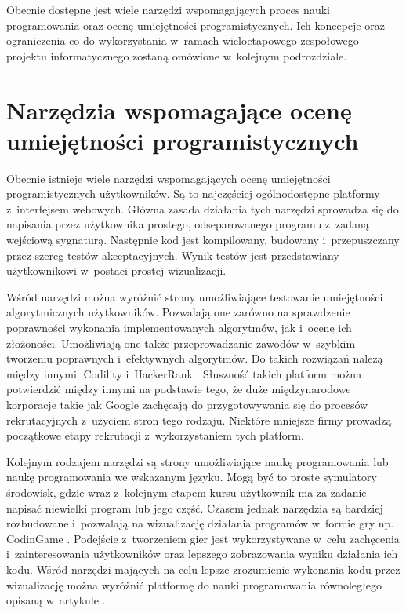 Obecnie dostępne jest wiele narzędzi wspomagających proces nauki programowania oraz ocenę umiejętności programistycznych.
Ich koncepcje oraz ograniczenia co do wykorzystania w~ramach wieloetapowego zespołowego projektu informatycznego zostaną omówione w~kolejnym podrozdziale.


\section{Narzędzia wspomagające ocenę umiejętności programistycznych}
\label{tools}

Obecnie istnieje wiele narzędzi wspomagających ocenę umiejętności programistycznych użytkowników.
Są to najczęściej ogólnodostępne platformy z~interfejsem webowych.
Główna zasada działania tych narzędzi sprowadza się do napisania przez użytkownika prostego, odseparowanego programu z~zadaną wejściową sygnaturą.
Następnie kod jest kompilowany, budowany i~przepuszczany przez szereg testów akceptacyjnych.
Wynik testów jest przedstawiany użytkownikowi w~postaci prostej wizualizacji.

Wśród narzędzi można wyróżnić strony umożliwiające testowanie umiejętności algorytmicznych użytkowników.
Pozwalają one zarówno na sprawdzenie poprawności wykonania implementowanych algorytmów, jak i~ocenę ich złożoności.
Umożliwiają one także przeprowadzanie zawodów w~szybkim tworzeniu poprawnych i~efektywnych algorytmów.
Do takich rozwiązań należą między innymi: Codility \cite{codility} i~HackerRank \cite{hacker-rank}.
Słuszność takich platform można potwierdzić między innymi na podstawie tego, że duże międzynarodowe korporacje takie jak Google zachęcają do przygotowywania się do procesów rekrutacyjnych z~użyciem stron tego rodzaju.
Niektóre mniejsze firmy prowadzą początkowe etapy rekrutacji z~wykorzystaniem tych platform.

Kolejnym rodzajem narzędzi są strony umożliwiające naukę programowania lub naukę programowania we wskazanym języku.
Mogą być to proste symulatory środowisk, gdzie wraz z~kolejnym etapem kursu użytkownik ma za zadanie napisać niewielki program lub jego część.
Czasem jednak narzędzia są bardziej rozbudowane i~pozwalają na wizualizację działania programów w~formie gry np. CodinGame \cite{game-coder}.
Podejście z~tworzeniem gier jest wykorzystywane w~celu zachęcenia i~zainteresowania użytkowników oraz lepszego zobrazowania wyniku działania ich kodu.
Wśród narzędzi mających na celu lepsze zrozumienie wykonania kodu przez wizualizację można wyróżnić platformę do nauki programowania równoległego opisaną w~artykule \cite{pharaller-platform}.

